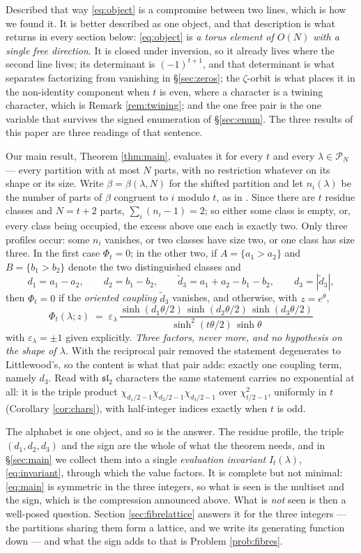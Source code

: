 \documentclass[11pt,reqno]{amsart}
\theoremstyle{plain}
\theoremstyle{definition}
\newcommand{\PP}{\mathcal{P}}
\begin{document}
Described that way \eqref{eq:object} is a compromise between two lines, which is how we found it. It
is better described as one object, and that description is what returns in every section below:
\eqref{eq:object} is \emph{a torus element of $O(N)$ with a single free direction}. It is closed
under inversion, so it already lives where the second line lives; its determinant is $(-1)^{t+1}$,
and that determinant is what separates factorizing from vanishing in \S\ref{sec:zeros}; the
$\zeta$-orbit is what places it in the non-identity component when $t$ is even, where a character is
a twining character, which is Remark \ref{rem:twining}; and the one free pair is the one variable
that survives the signed enumeration of \S\ref{sec:enum}. The three results of this paper are three
readings of that sentence.

Our main result, Theorem \ref{thm:main}, evaluates it for
every $t$ and every $\lambda\in\PP_N$ --- every partition with at most $N$ parts, with no
restriction whatever on its shape or its size. Write $\beta=\beta(\lambda,N)$ for the shifted partition and let
$n_i(\lambda)$ be the number of parts of $\beta$ congruent to $i$ modulo $t$, as in \cite{AK22}. Since
there are $t$ residue classes and $N=t+2$ parts, $\sum_i(n_i-1)=2$; so either some class is empty,
or, every class being occupied, the excess above one each is exactly two. Only three profiles
occur: some $n_i$ vanishes, or two classes have size two, or one class has size three. In the first
case $\Phi_t=0$; in the other two, if $A=\{a_1>a_2\}$ and $B=\{b_1>b_2\}$ denote the two
distinguished classes and
\[
d_1=a_1-a_2,\qquad d_2=b_1-b_2,\qquad
\tilde d_3=a_1+a_2-b_1-b_2,\qquad d_3=|\tilde d_3| ,
\]
then $\Phi_t=0$ if the \emph{oriented coupling} $\tilde d_3$ vanishes, and otherwise, with
$z=e^{\theta}$,
\[
\boxed{\;\;\Phi_t(\lambda;z)\;=\;\varepsilon_\lambda\,
\frac{\sinh(d_1\theta/2)\,\sinh(d_2\theta/2)\,\sinh(d_3\theta/2)}
{\sinh^2(t\theta/2)\,\sinh\theta}\;\;}
\]
with $\varepsilon_\lambda=\pm1$ given explicitly. \emph{Three factors, never more, and no hypothesis
on the shape of $\lambda$.} With the reciprocal pair removed the statement degenerates to
Littlewood's, so the content is what that pair adds: exactly one coupling term, namely $d_3$. Read
with $\mathfrak{sl}_2$ characters the same statement carries no exponential at all: it is the triple
product $\chi_{d_1/2-1}\chi_{d_2/2-1}\chi_{d_3/2-1}$ over $\chi_{t/2-1}^2$, uniformly in $t$
(Corollary \ref{cor:chars}), with half-integer indices exactly when $t$ is odd.

The alphabet is one object, and so is the answer. The residue profile, the triple $(d_1,d_2,d_3)$ and
the sign are the whole of what the theorem needs, and in \S\ref{sec:main} we collect them into a
single \emph{evaluation invariant} $I_t(\lambda)$, \eqref{eq:invariant}, through which the value factors.
It is complete but not minimal: \eqref{eq:main} is symmetric in the three integers, so what is seen
is the multiset and the sign, which is the compression announced above. What is \emph{not} seen is
then a well-posed question. Section \ref{sec:fibrelattice} answers it for the three integers ---
the partitions sharing them form a lattice, and we write its generating function down --- and what
the sign adds to that is Problem \ref{prob:fibres}.
\end{document}
